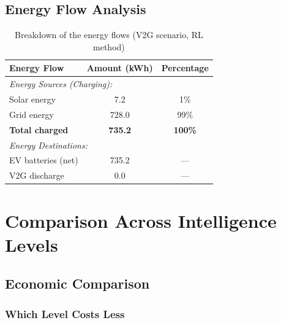 \subsection{Energy Flow Analysis} \label{subsec:v2g_energy_flow}
\begin{table}[H]
\centering
\caption{Breakdown of the energy flows (V2G scenario, RL method)}
\label{tab:v2g_energy_flow}
\begin{tabular}{@{}lcc@{}}
\toprule
\textbf{Energy Flow} & \textbf{Amount (kWh)} & \textbf{Percentage} \\
\midrule
\multicolumn{3}{l}{\textit{Energy Sources (Charging):}} \\
\quad Solar energy & 7.2 & 1\% \\
\quad Grid energy & 728.0 & 99\% \\
\quad \textbf{Total charged} & \textbf{735.2} & \textbf{100\%} \\
\midrule
\multicolumn{3}{l}{\textit{Energy Destinations:}} \\
\quad EV batteries (net) & 735.2 & --- \\
\quad V2G discharge & 0.0 & --- \\
\bottomrule
\end{tabular}
\end{table}

\section{Comparison Across Intelligence Levels}
\label{sec:comparison_across_intelligence_levels}
\subsection{Economic Comparison}
\label{subsec:economic_comparison}

\subsubsection{Which Level Costs Less}
\begin{table}[H] 
\centering 
\caption{Daily electricity cost (€) by control strategy, with incremental cost and percentage change relative to the rule-based (Simple) baseline}
\label{tab:cost}
\end{table}

